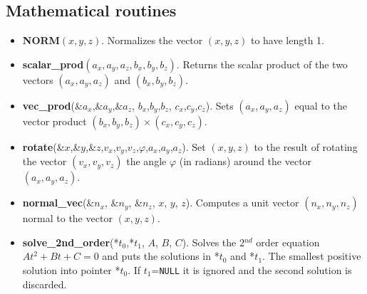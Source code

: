 \subsection{Mathematical routines}
\begin{itemize}
\item {\bfseries NORM}$(x,y,z)$. Normalizes the vector $(x,y,z)$ to have
  length 1.
\item {\bfseries scalar\_prod}$(a_x,a_y,a_z, b_x,b_y,b_z)$. Returns the scalar
  product of the two vectors $(a_x,a_y,a_z)$ and $(b_x,b_y,b_z)$.
\item {\bfseries vec\_prod}(\&$a_x$,\&$a_y$,\&$a_z$, $b_x$,$b_y$,$b_z$, $c_x$,$c_y$,$c_z$). Sets
  $(a_x,a_y,a_z)$ equal to the vector product $(b_x,b_y,b_z) \times (c_x,c_y,c_z)$.
\item {\bfseries rotate}(\&$x$,\&$y$,\&$z$,$v_x$,$v_y$,$v_z$,$\varphi$,$a_x$,$a_y$,$a_z$). Set
  $(x,y,z)$ to the result of rotating the vector $(v_x,v_y,v_z)$
  the angle $\varphi$ (in radians) around the vector $(a_x,a_y,a_z)$.
\item {\bfseries normal\_vec}(\&$n_x$, \&$n_y$, \&$n_z$, $x$, $y$, $z$).
  Computes a unit vector $(n_x, n_y, n_z)$ normal to the vector
  $(x,y,z)$.
\item {\bfseries solve\_2nd\_order}(*$t_0$,*$t_1$, $A$,  $B$,  $C$).
  Solves the 2$^{nd}$ order equation $At^2 + Bt + C = 0$ and puts the solutions in
  *$t_0$ and *$t_1$. The smallest positive solution into pointer *$t_0$. If $t_1$=\texttt{NULL}
  it is ignored and the second solution is discarded.
\end{itemize}

